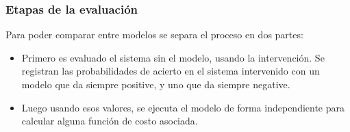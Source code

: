 \begin{frame}
\frametitle{Etapas de la evaluaci\'on}
Para poder comparar entre modelos se separa el proceso en dos partes:\\
\vspace{3mm}
\begin{itemize}
\item Primero es evaluado el sistema sin el modelo, usando la intervenci\'on. Se registran las probabilidades de acierto en el sistema intervenido con un modelo que da siempre positive, y uno que da siempre negative.
\item Luego usando esos valores, se ejecuta el modelo de forma independiente para calcular alguna funci\'on de costo asociada.
\end{itemize}
\end{frame}